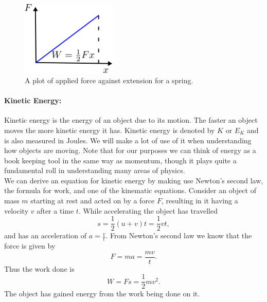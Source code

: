 \documentclass[a4paper,12pt]{book}
\begin{document}
\begin{figure}[ht]
    \centering
    \includegraphics[width=0.4\textwidth]{figures/spring_work.png}
    \caption{A plot of applied force against extension for a spring.}
    \label{fig: spring extension}
\end{figure}


\paragraph{Kinetic Energy:} Kinetic energy is the energy of an object due to its motion. The faster an object moves the more kinetic energy it has. Kinetic energy is denoted by $K$ or $E_{K}$ and is also measured in Joules. We will make a lot of use of it when understanding how objects are moving. Note that for our purposes we can think of energy as a book keeping tool in the same way as momentum, though it plays quite a fundamental roll in understanding many areas of physics.\\

We can derive an equation for kinetic energy by making use Newton's second law, the formula for work, and one of the kinematic equations. Consider an object of mass $m$ starting at rest and acted on by a force $F$, resulting in it having a velocity $v$ after a time $t$. While accelerating the object has travelled
\begin{equation*}
s=\frac{1}{2}\left(u+v\right)t=\frac{1}{2}vt,
\end{equation*}
and has an acceleration of $a=\frac{v}{t}$. From Newton's second law we know that the force is given by
\begin{equation*}
F=ma=\frac{mv}{t}.
\end{equation*}
Thus the work done is
\begin{equation*}
W=Fs=\frac{1}{2}mv^{2}.
\end{equation*}
The object has gained energy from the work being done on it.
\end{document}
